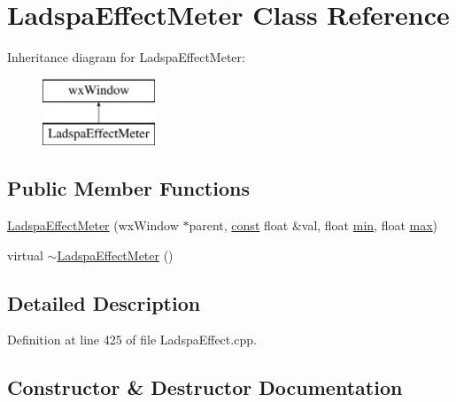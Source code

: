 \hypertarget{class_ladspa_effect_meter}{}\section{Ladspa\+Effect\+Meter Class Reference}
\label{class_ladspa_effect_meter}
Inheritance diagram for Ladspa\+Effect\+Meter\+:\begin{figure}[H]
\begin{center}
\leavevmode
\includegraphics[height=2.000000cm]{class_ladspa_effect_meter}
\end{center}
\end{figure}
\subsection*{Public Member Functions}
\begin{DoxyCompactItemize}
\item 
\hyperlink{class_ladspa_effect_meter_a62929e783c202225f0de394e53a41b60}{Ladspa\+Effect\+Meter} (wx\+Window $\ast$parent, \hyperlink{getopt1_8c_a2c212835823e3c54a8ab6d95c652660e}{const} float \&val, float \hyperlink{_compare_audio_command_8cpp_abd8bbcfabb3ddef2ccaafb9928a37b95}{min}, float \hyperlink{_t_d_stretch_8cpp_ac39d9cef6a5e030ba8d9e11121054268}{max})
\item 
virtual \hyperlink{class_ladspa_effect_meter_acd38df56ed24ae4515b8dfc72ae36368}{$\sim$\+Ladspa\+Effect\+Meter} ()
\end{DoxyCompactItemize}


\subsection{Detailed Description}


Definition at line 425 of file Ladspa\+Effect.\+cpp.



\subsection{Constructor \& Destructor Documentation}
